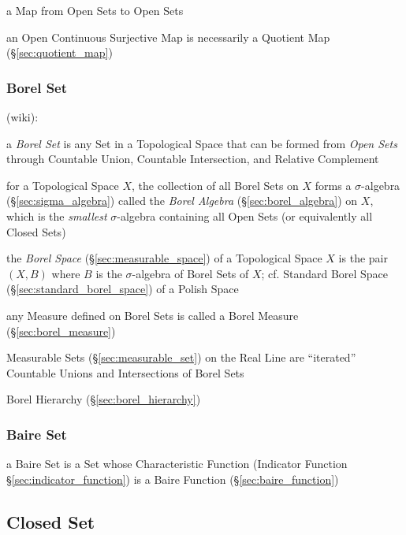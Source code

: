 a Map from Open Sets to Open Sets

an Open Continuous Surjective Map is necessarily a Quotient Map
(\S\ref{sec:quotient_map})



\subsubsection{Borel Set}\label{sec:borel_set}

(wiki):

a \emph{Borel Set} is any Set in a Topological Space that can be formed from
\emph{Open Sets} through Countable Union, Countable Intersection, and Relative
Complement

for a Topological Space $X$, the collection of all Borel Sets on $X$ forms a
$\sigma$-algebra (\S\ref{sec:sigma_algebra}) called the \emph{Borel Algebra}
(\S\ref{sec:borel_algebra}) on $X$, which is the \emph{smallest}
$\sigma$-algebra containing all Open Sets (or equivalently all Closed Sets)

the \emph{Borel Space} (\S\ref{sec:measurable_space}) of a Topological Space $X$
is the pair $(X,B)$ where $B$ is the $\sigma$-algebra of Borel Sets of $X$; cf.
Standard Borel Space (\S\ref{sec:standard_borel_space}) of a Polish Space

any Measure defined on Borel Sets is called a Borel Measure
(\S\ref{sec:borel_measure})

Measurable Sets (\S\ref{sec:measurable_set}) on the Real Line are ``iterated''
Countable Unions and Intersections of Borel Sets

\fist Borel Hierarchy (\S\ref{sec:borel_hierarchy})



\subsubsection{Baire Set}\label{sec:baire_set}

a Baire Set is a Set whose Characteristic Function (Indicator Function
\S\ref{sec:indicator_function}) is a Baire Function (\S\ref{sec:baire_function})



\subsection{Closed Set}\label{sec:closed_set}


